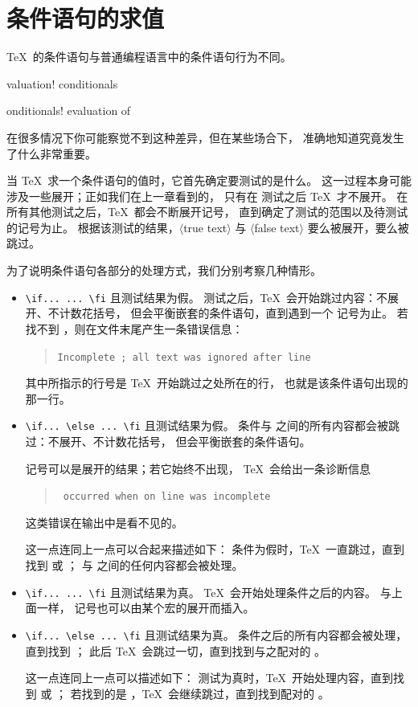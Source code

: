 \documentclass[a4paper]{rapport3}
\def\gr#1{$\langle$#1$\rangle$}\def\key#1{{\tt#1}}
\newenvironment{disp}{\begin{quotation}}{\end{quotation}}
\def\term#1\par{\index{#1}}
\begin{document}
\section{条件语句的求值}

\TeX\ 的条件语句与普通编程语言中的条件语句行为不同。
\term evaluation! conditionals\par\term conditionals! evaluation of\par
在很多情况下你可能察觉不到这种差异，但在某些场合下，
准确地知道究竟发生了什么非常重要。

当 \TeX\ 求一个条件语句的值时，它首先确定要测试的是什么。
这一过程本身可能涉及一些展开；正如我们在上一章看到的，
只有在  测试之后 \TeX\ 才不展开。
在所有其他测试之后，\TeX\ 都会不断展开记号，
直到确定了测试的范围以及待测试的记号为止。
根据该测试的结果，\gr{true text} 与 \gr{false text}
要么被展开，要么被跳过。

为了说明条件语句各部分的处理方式，我们分别考察几种情形。
\begin{itemize}
\item \verb>\if... ... \fi> 且测试结果为假。
 测试之后，\TeX\ 会开始跳过内容：不展开、不计数花括号，
 但会平衡嵌套的条件语句，直到遇到一个  记号为止。
 若找不到 ，则在文件末尾产生一条错误信息：
 \begin{disp}\tt Incomplete ; all text was ignored after line 
 \end{disp} 其中所指示的行号是 \TeX\ 开始跳过之处所在的行，
也就是该条件语句出现的那一行。

\item \verb>\if... \else ... \fi> 且测试结果为假。
 条件与  之间的所有内容都会被跳过：不展开、不计数花括号，
 但会平衡嵌套的条件语句。

  记号可以是展开的结果；若它始终不出现，
 \TeX\ 会给出一条诊断信息
 \begin{disp}\tt {} occurred when  on line 
      was incomplete\end{disp}
 这类错误在输出中是看不见的。

 这一点连同上一点可以合起来描述如下：
 条件为假时，\TeX\ 一直跳过，直到找到  或 ；
  与  之间的任何内容都会被处理。
 
\item \verb>\if... ... \fi> 且测试结果为真。
 \TeX\ 会开始处理条件之后的内容。
 与上面一样， 记号也可以由某个宏的展开而插入。
 
\item \verb>\if... \else ... \fi> 且测试结果为真。
 条件之后的所有内容都会被处理，直到找到 ；
 此后 \TeX\ 会跳过一切，直到找到与之配对的 。
 
 这一点连同上一点可以描述如下：
 测试为真时，\TeX\ 开始处理内容，直到找到  或 ；
 若找到的是 ，\TeX\ 会继续跳过，直到找到配对的 。
\end{itemize}
\end{document}
